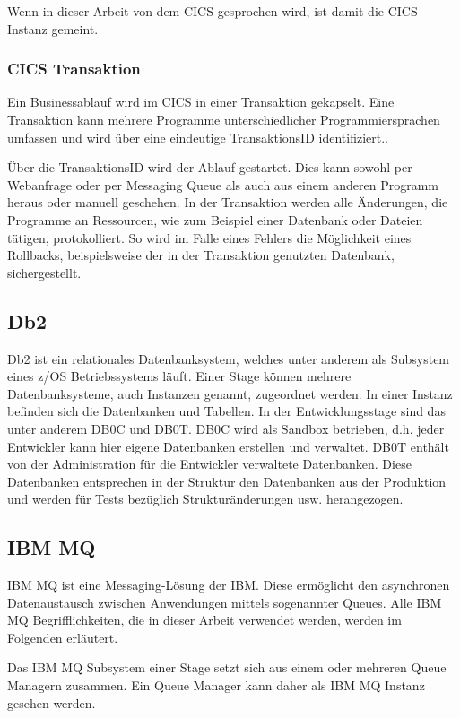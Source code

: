 Wenn in dieser Arbeit von dem CICS gesprochen wird, ist damit die CICS-Instanz  gemeint.

\subsubsection{CICS Transaktion}\label{subsec:trans}
Ein Businessablauf wird im CICS in einer Transaktion gekapselt.
Eine Transaktion kann mehrere Programme unterschiedlicher Programmiersprachen umfassen und wird über eine eindeutige \glqq TransaktionsID\grqq{} identifiziert..

Über die TransaktionsID wird der Ablauf gestartet.
Dies kann sowohl per Webanfrage oder per Messaging Queue als auch aus einem anderen Programm heraus oder manuell geschehen.
In der Transaktion werden alle Änderungen, die Programme an Ressourcen, wie zum Beispiel einer Datenbank oder Dateien tätigen, protokolliert.
So wird im Falle eines Fehlers die Möglichkeit eines Rollbacks, beispielsweise der in der Transaktion genutzten Datenbank, sichergestellt.
 \cite{Rayns.2011}

\subsection{Db2}\label{sssec:db2}
Db2 ist ein relationales Datenbanksystem, welches unter anderem als Subsystem eines z/OS Betriebssystems läuft.
Einer Stage können mehrere Datenbanksysteme, auch Instanzen genannt, zugeordnet werden.
In einer Instanz befinden sich die Datenbanken und Tabellen. 
In der Entwicklungsstage sind das unter anderem \glqq DB0C\grqq{} und \glqq DB0T\grqq.
DB0C wird als Sandbox betrieben, d.h. jeder Entwickler kann hier eigene Datenbanken erstellen und verwaltet.
DB0T enthält von der Administration für die Entwickler verwaltete Datenbanken.
Diese Datenbanken entsprechen in der Struktur den Datenbanken aus der Produktion und werden für Tests bezüglich Strukturänderungen usw. herangezogen.

\subsection{IBM MQ}\label{sec:mq}
IBM MQ ist eine Messaging-Lösung der IBM.
Diese ermöglicht den asynchronen Datenaustausch zwischen Anwendungen mittels sogenannter Queues.
Alle IBM MQ Begrifflichkeiten, die in dieser Arbeit verwendet werden, werden im Folgenden erläutert.
\cite{Aranha.2013}

Das IBM MQ Subsystem einer Stage setzt sich aus einem oder mehreren Queue Managern zusammen.
Ein Queue Manager kann daher als IBM MQ Instanz gesehen werden.

